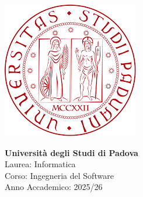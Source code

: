 \documentclass[a4paper,12pt]{article}
\begin{document}
\vspace*{\fill}

\begin{center}
    \begin{minipage}{0.25\textwidth}
        \centering
        \includegraphics[width=\linewidth]{logoUni.png}
    \end{minipage}
    \hfill
    \begin{minipage}{0.7\textwidth}
        \raggedright
        {\color{red}\LARGE \textbf{Università degli Studi di Padova}}\\[0.3cm]
        {\large
        Laurea: Informatica\\
        Corso: Ingegneria del Software\\
        Anno Accademico: 2025/26
        }
    \end{minipage}
\end{center}

\vspace{1cm}
\end{document}
